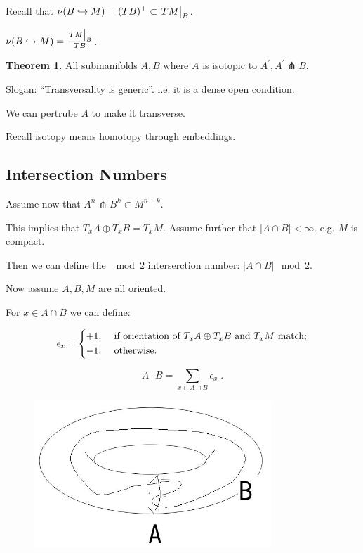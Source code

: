 \documentclass{article}
\theoremstyle{definition}
\newtheorem{theorem}{Theorem}
\begin{document}
    Recall that \(\nu(B \hookrightarrow M) = (TB)^\perp \subset \eval{TM}_{B}\).

    \(\nu(B \hookrightarrow M) = \frac{\eval{TM}_{B}}{TB}\).

    \begin{theorem}
        All submanifolds \(A, B\) where \(A\) is isotopic to \(A^{\prime}, A^{\prime} \pitchfork B\).

        Slogan: ``Transversality is generic''. i.e. it is a dense open condition.
    \end{theorem}

    We can pertrube \(A\) to make it transverse.

    Recall isotopy means homotopy through embeddings.

    \subsection*{Intersection Numbers}

    Assume now that \(A ^n \pitchfork B^k \subset M^{n+k}\).

    This implies that \(T_x A \oplus T_x B = T_x M\). Assume further that \(\vert A\cap B \vert < \infty\). e.g. \(M\) is compact.

    Then we can define the \(\mod 2\) interserction number: \(\vert A\cap B \vert \mod 2\).
    
    Now assume \(A, B, M\) are all oriented.

    For \(x\in A \cap B\) we can define:

    \[
        \epsilon_x = \begin{dcases}
            +1, &\text{ if orientation of \(T_x A \oplus T_x B\) and \(T_x M\) match} ;\\
            -1, &\text{ otherwise}.
        \end{dcases}
    \]

    \[
        A \cdot B = \sum_{x\in A \cap B} \epsilon_x\;.
    \]

    \begin{figure}[H]
        \centering
        \includegraphics[width=0.8\textwidth]{img/intersectionmod2}
    \end{figure}
\end{document}
